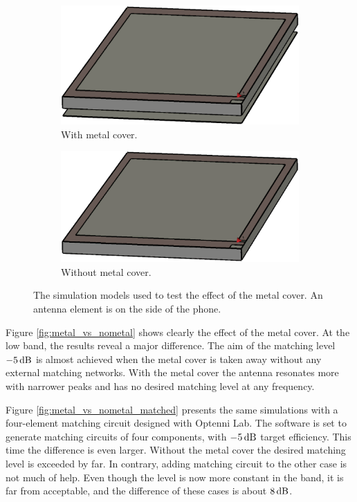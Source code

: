 \begin{figure}[!ht]
    \centering
    \begin{subfigure}[b]{0.49\textwidth}
    \includegraphics[width=\textwidth]{img/metal_cover.eps}
    \caption{With metal cover.}
    \label{fig:metal_cover}
    \end{subfigure}
    \begin{subfigure}[b]{0.49\textwidth}
    \includegraphics[width=\textwidth]{img/no_metal_cover.eps}
    \caption{Without metal cover.}
    \label{fig:nometal_cover}
    \end{subfigure}
    \caption{The simulation models used to test the effect of the metal cover. An antenna element is on the side of the phone.}
    \label{fig:metal_vs_nometal_model}
\end{figure}

Figure \ref{fig:metal_vs_nometal} shows clearly the effect of the metal cover. At the low band, the results reveal a major difference. The aim of the matching level $-5\,\mathrm{dB}$ is almost achieved when the metal cover is taken away without any external matching networks. With the metal cover the antenna resonates more with narrower peaks and has no desired matching level at any frequency. 

Figure \ref{fig:metal_vs_nometal_matched} presents the same simulations with a four-element matching circuit designed with Optenni Lab. The software is set to generate matching circuits of four components, with $-5\,\mathrm{dB}$ target efficiency. This time the difference is even larger. Without the metal cover the desired matching level is exceeded by far. In contrary, adding matching circuit to the other case is not much of help. Even though the level is now more constant in the band, it is far from acceptable, and the difference of these cases is about $8\,\mathrm{dB}$.

